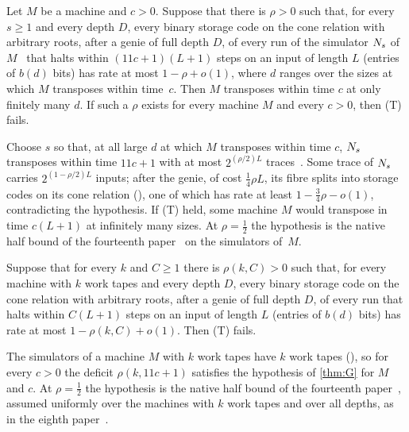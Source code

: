\begin{theorem}\label{thm:G}
Let $M$ be a machine and $c>0$. Suppose that there is $\rho>0$ such that, for every $s\ge1$ and every depth $D$, every binary storage
code on the cone relation with arbitrary roots, after a genie of full depth $D$, of every run of the simulator $N_s$ of $M$~\cite[Theorem~S]{HighRate2026}
that halts within $(11c+1)(L+1)$ steps on an input of length $L$ (entries of $b(d)$ bits) has rate at most $1-\rho+o(1)$, where $d$ ranges
over the sizes at which $M$ transposes within time~$c$. Then $M$ transposes within time $c$ at only finitely many $d$. If such a $\rho$
exists for every machine $M$ and every $c>0$, then (T) fails.
\end{theorem}

\begin{outline}
Choose $s$ so that, at all large $d$ at which $M$ transposes within time $c$, $N_s$ transposes within time $11c+1$ with at most
$2^{(\rho/2)L}$ traces~\cite[Theorem~S]{HighRate2026}. Some trace of $N_s$ carries $2^{(1-\rho/2)L}$ inputs; after the genie, of cost
$\frac14\rho L$, its fibre splits into storage codes on its cone relation (), one of
which has rate at least $1-\frac34\rho-o(1)$, contradicting the hypothesis. If (T) held, some machine $M$ would transpose in time
$c(L+1)$ at infinitely many sizes. At $\rho=\frac12$ the hypothesis is the native half bound of the fourteenth
paper~\cite[Corollary~L]{BoundedStack2026} on the simulators of~$M$.
\end{outline}

\begin{corollary}\label{cor:G-uniform}
Suppose that for every $k$ and $C\ge1$ there is $\rho(k,C)>0$ such that, for every machine with $k$ work tapes and every depth $D$, every
binary storage code on the cone relation with arbitrary roots, after a genie of full depth $D$, of every run that halts within $C(L+1)$ steps on an input of
length $L$ (entries of $b(d)$ bits) has rate at most $1-\rho(k,C)+o(1)$. Then (T) fails.
\end{corollary}

\begin{outline}
The simulators of a machine $M$ with $k$ work tapes have $k$ work tapes (), so for every $c>0$ the deficit
$\rho(k,11c+1)$ satisfies the hypothesis of \cref{thm:G} for $M$ and $c$. At $\rho=\frac12$ the hypothesis is the native half bound of the
fourteenth paper~\cite[Corollary~L]{BoundedStack2026}, assumed uniformly over the machines with $k$ work tapes and over all depths, as in
the eighth paper~\cite[\S6.2]{EighthPaper2026}.
\end{outline}

